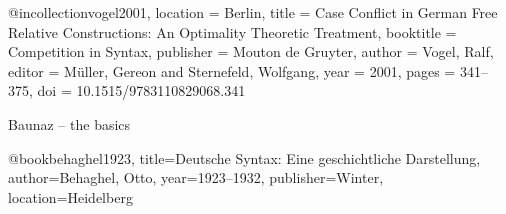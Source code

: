 @incollection{vogel2001,
  location = {Berlin},
  title = {Case Conflict in German Free Relative Constructions: {{An}} Optimality Theoretic Treatment},
  booktitle = {Competition in Syntax},
  publisher = {{Mouton de Gruyter}},
  author = {Vogel, Ralf},
  editor = {Müller, Gereon and Sternefeld, Wolfgang},
  year = {2001},
  pages = {341--375},
  doi = {10.1515/9783110829068.341}
}


Baunaz – the basics


@book{behaghel1923,
  title={Deutsche Syntax: Eine geschichtliche Darstellung},
  author={Behaghel, Otto},
  year={1923--1932},
  publisher={Winter},
  location={Heidelberg}
}




